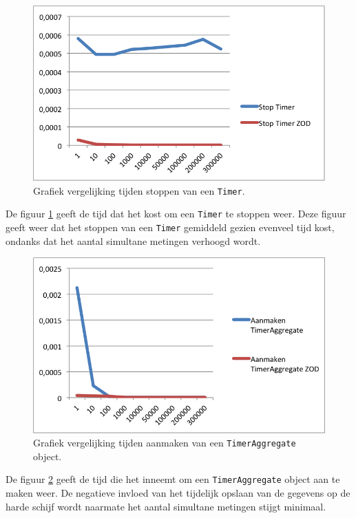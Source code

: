 \begin{figure}[h]
  \centering
  \includegraphics[scale=1.0]{Afbeeldingen/Evaluatie/StopTimer}
  \caption{Grafiek vergelijking tijden stoppen van een \texttt{Timer}.}
  \label{fig:GraphTimerStop}
\end{figure}

De figuur \ref{fig:GraphTimerStop} geeft de tijd dat het kost om een \texttt{Timer} te stoppen weer. Deze figuur geeft weer dat het stoppen van een \texttt{Timer} gemiddeld gezien evenveel tijd kost, ondanks dat het aantal simultane metingen verhoogd wordt. \\


\begin{figure}[h]
  \centering
  \includegraphics[scale=1.0]{Afbeeldingen/Evaluatie/AanmakenTimerAggregate}
  \caption{Grafiek vergelijking tijden aanmaken van een \texttt{TimerAggregate} object.}
  \label{fig:GraphTimerAggregate}
\end{figure}

De figuur \ref{fig:GraphTimerAggregate} geeft de tijd die het inneemt om een \texttt{TimerAggregate} object aan te maken weer. De negatieve invloed van het tijdelijk opslaan van de gegevens op de harde schijf wordt naarmate het aantal simultane metingen stijgt minimaal. \\

